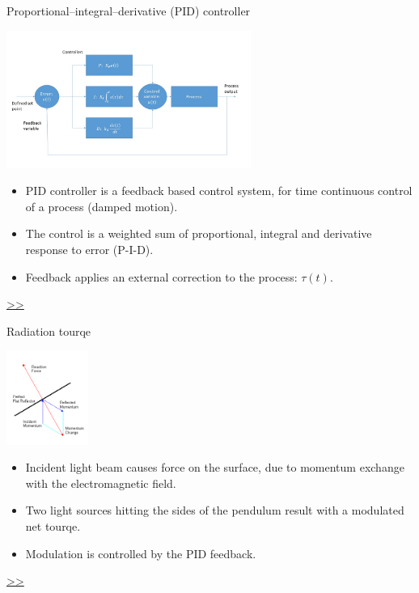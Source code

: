 \documentclass{beamer}
\begin{document}
\begin{frame}{\hypertarget{frame:Proportional–integral–derivative (PID) controller}{Proportional–integral–derivative (PID) controller}}
	\begin{center}		
		\includegraphics[width=0.6\textwidth,keepaspectratio]{pid_diagram_powerpoint.jpg}
    \end{center}
	\begin{itemize}	
		\item PID controller is a feedback based control system, for time continuous control of a process (damped motion).
		\item The control is a weighted sum of proportional, integral and derivative response to error (P-I-D).
		\item Feedback applies an external correction to the process: $\tau(t)$.	
	\end{itemize}
	\hyperlink{frame:Proportional–integral–derivative (PID) controller 1}{>>} 
\end{frame}

\begin{frame}{\hypertarget{frame:Radiation tourqe}{Radiation tourqe}}
	\begin{center}		
		\includegraphics[width=0.2\textwidth,keepaspectratio]{radiation.PNG}
    \end{center}

	
	\begin{itemize}		
		
		\item Incident light beam causes force on the surface, due to momentum exchange with the electromagnetic field.
		\item Two light sources hitting the sides of the pendulum result with a modulated net tourqe.
		\item Modulation is controlled by the PID feedback.
		
	\end{itemize}
	\hyperlink{frame:Radiation tourqe 1}{>>} 
\end{frame}
\end{document}

